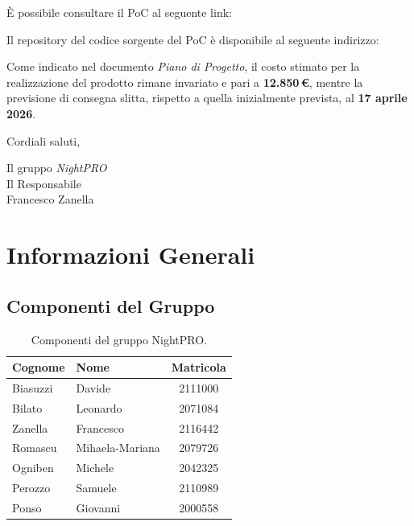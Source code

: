 \documentclass[a4paper, 11pt, oneside]{scrartcl} %
\begin{document}
È possibile consultare il PoC al seguente link:

    \begin{center}

\end{center}

Il repository del codice sorgente del PoC è disponibile al seguente indirizzo:

    \begin{center}

\end{center}
Come indicato nel documento \textit{Piano di Progetto}, il costo stimato per la realizzazione del prodotto rimane invariato e pari a \textbf{12.850\,€}, mentre la previsione di consegna slitta, rispetto a quella inizialmente prevista, al \textbf{17 aprile 2026}.

\vspace{0.5cm}

Cordiali saluti,
\begin{flushright}
    Il gruppo \emph{NightPRO}\\[1cm]
    Il Responsabile\\[0.3cm]
    Francesco Zanella
\end{flushright}

\newpage
\section*{Informazioni Generali}

\subsection*{Componenti del Gruppo}

\begin{table}[h!]
\centering
\renewcommand{\arraystretch}{1.2} %
\begin{tabular}{@{}llc@{}}
\toprule
\textbf{Cognome} & \textbf{Nome} & \textbf{Matricola} \\
\midrule
Biasuzzi & Davide & 2111000 \\
Bilato & Leonardo & 2071084 \\
Zanella & Francesco & 2116442 \\
Romascu & Mihaela-Mariana & 2079726 \\
Ogniben & Michele & 2042325 \\
Perozzo & Samuele & 2110989 \\
Ponso & Giovanni & 2000558 \\
\bottomrule
\end{tabular}
\caption{Componenti del gruppo NightPRO.}
\end{table}
\end{document}
